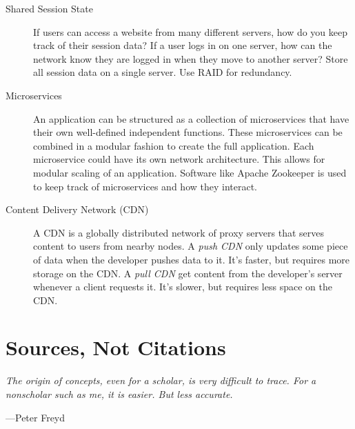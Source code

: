 \begin{description}
	\item[Shared Session State] If users can access a website from many different servers, how do you keep track of their session data? If a user logs in on one server, how can the network know they are logged in when they move to another server? Store all session data on a single server. Use RAID for redundancy.
	
	\item[Microservices] An application can be structured as a collection of microservices that have their own well-defined independent functions. These microservices can be combined in a modular fashion to create the full application. Each microservice could have its own network architecture. This allows for modular scaling of an application. Software like Apache Zookeeper is used to keep track of microservices and how they interact.
	
	\item[Content Delivery Network (CDN)] A CDN is a globally distributed network of proxy servers that serves content to users from nearby nodes. A \textit{push CDN} only updates some piece of data when the developer pushes data to it. It's faster, but requires more storage on the CDN. A \textit{pull CDN} get content from the developer's server whenever a client requests it. It's slower, but requires less space on the CDN.
\end{description}

\newpage


\toclineskip
\section{Sources, Not Citations}

\begin{displayquote}
	\textit{The origin of concepts, even for a scholar, is very difficult to trace. For a nonscholar such as me, it is easier. But less accurate.}
	\begin{flushright}
		---Peter Freyd
	\end{flushright}
	\vspace{4mm}
\end{displayquote}

